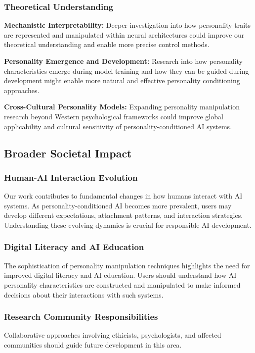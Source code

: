 \subsubsection{Theoretical Understanding}

\textbf{Mechanistic Interpretability:} Deeper investigation into how personality traits are represented and manipulated within neural architectures could improve our theoretical understanding and enable more precise control methods.

\textbf{Personality Emergence and Development:} Research into how personality characteristics emerge during model training and how they can be guided during development might enable more natural and effective personality conditioning approaches.

\textbf{Cross-Cultural Personality Models:} Expanding personality manipulation research beyond Western psychological frameworks could improve global applicability and cultural sensitivity of personality-conditioned AI systems.

\subsection{Broader Societal Impact}

\subsubsection{Human-AI Interaction Evolution}

Our work contributes to fundamental changes in how humans interact with AI systems. As personality-conditioned AI becomes more prevalent, users may develop different expectations, attachment patterns, and interaction strategies. Understanding these evolving dynamics is crucial for responsible AI development.

\subsubsection{Digital Literacy and AI Education}

The sophistication of personality manipulation techniques highlights the need for improved digital literacy and AI education. Users should understand how AI personality characteristics are constructed and manipulated to make informed decisions about their interactions with such systems.

\subsubsection{Research Community Responsibilities}

Collaborative approaches involving ethicists, psychologists, and affected communities should guide future development in this area.
